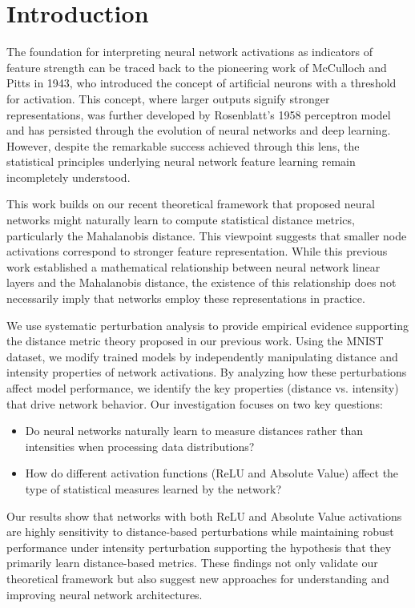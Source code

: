 \section{Introduction}

The foundation for interpreting neural network activations as indicators of feature strength can be traced back to the pioneering work of McCulloch and Pitts in 1943, who introduced the concept of artificial neurons with a threshold for activation.  This concept, where larger outputs signify stronger representations, was further developed by Rosenblatt's 1958 perceptron model and has persisted through the evolution of neural networks and deep learning.  However, despite the remarkable success achieved through this lens, the statistical principles underlying neural network feature learning remain incompletely understood. 

This work builds on our recent theoretical framework \cite{oursland2024interpreting} that proposed neural networks might naturally learn to compute statistical distance metrics, particularly the Mahalanobis distance. This viewpoint suggests that smaller node activations correspond to stronger feature representation. While this previous work established a mathematical relationship between neural network linear layers and the Mahalanobis distance, the existence of this relationship does not necessarily imply that networks employ these representations in practice. 

We use systematic perturbation analysis to provide empirical evidence supporting the distance metric theory proposed in our previous work. Using the MNIST dataset, we modify trained models by independently manipulating distance and intensity properties of network activations. By analyzing how these perturbations affect model performance, we identify the key properties (distance vs. intensity) that drive network behavior. Our investigation focuses on two key questions:

\begin{itemize}
    \item Do neural networks naturally learn to measure distances rather than intensities when processing data distributions?
    \item How do different activation functions (ReLU and Absolute Value) affect the type of statistical measures learned by the network?
\end{itemize}

Our results show that networks with both ReLU and Absolute Value activations are highly sensitivity to distance-based perturbations while maintaining robust performance under intensity perturbation supporting the hypothesis that they primarily learn distance-based metrics. These findings not only validate our theoretical framework but also suggest new approaches for understanding and improving neural network architectures.